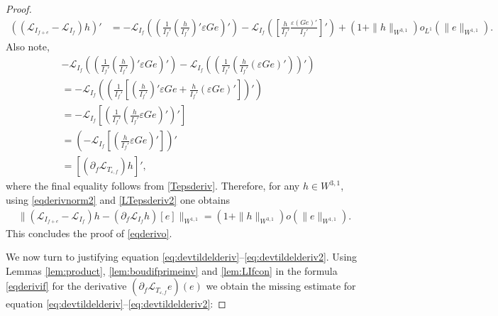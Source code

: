 \documentclass[12pt]{article}
\def\L{\mathcal{L}}
\newcommand{\eps}{\varepsilon}
\theoremstyle{plain}
\begin{document}
{\begin{proof}
\begin{align}\label{eqderivnorm2}
    \left(\left(\L_{I_{f+e}}-\L_{I_f}\right)h\right)'&= -\L_{I_f}\left(\left(\frac{1}{I_f'}\left(\frac{h}{I_f'}\right)'\eps Ge\right)'\right)-\L_{I_f}\left(\left[\frac{h}{I_{f}'}\frac{\eps (Ge)'}{I_{f}'}\right]'\right)+(1+\|h\|_{W^{3,1}})o_{L^1}(\|e\|_{W^{1,1}}).
\end{align}
Also note,
\begin{align}
 &-\L_{I_f}\left(\left(\frac{1}{I_f'}\left(\frac{h}{I_f'}\right)'\eps Ge\right)'\right)-\L_{I_f}\left(\left(\frac{1}{I_f'}\left(\frac{h}{I_{f}'}(\eps Ge)'\right)\right)'\right)\nonumber\\
 &=-\L_{I_f}\left(\left(\frac{1}{I_f'}\left[\left(\frac{h}{I_f'}\right)'\eps Ge+\frac{h}{I_{f}'}(\eps Ge)'\right]\right)'\right)\nonumber\\
 &=-\L_{I_f}\left[\left(\frac{1}{I_f'}\left(\frac{h}{I_{f}'} \eps G e\right)'\right)'\right]\nonumber\\
 &=\left(-\L_{I_f}\left[\left(\frac{h}{I_{f}'} \eps G e\right)'\right]\right)'\nonumber\\
 &= \left[(\partial_f\L_{T_{\eps, f}})h\right]', 
 \label{LTepsderiv2}
\end{align}
where the final equality follows from \eqref{Tepsderiv}.
Therefore, for any $h\in W^{3,1}$,
using \eqref{eqderivnorm2} and \eqref{LTepsderiv2} one obtains
\begin{align}\label{eq:derivif}
    \|(\L_{I_{ f+e}}-\L_{I_{ f}})h-(\partial_f\L_{I_{ f}}h)[e]\|_{W^{1,1}}=(1+\|h\|_{W^{3,1}})o(\|e\|_{W^{1,1}}).
\end{align}
 This concludes the proof of \eqref{eqderivo}.

We now turn to justifying 
equation \eqref{eq:devtildelderiv}--\eqref{eq:devtildelderiv2}. Using Lemmas \ref{lem:product}, \ref{lem:boudifprimeinv} and \ref{lem:LIfcon} in the formula \eqref{eqderivif} for the derivative $(\partial_f\L_{T_{\eps, f}}e)(e)$ we obtain the missing estimate for equation \eqref{eq:devtildelderiv}--\eqref{eq:devtildelderiv2}:



\end{proof}}
\end{document}

